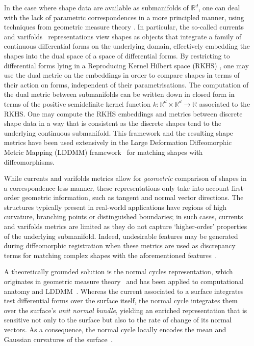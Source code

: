 \documentclass[sn-mathphys-num]{sn-jnl}%
\theoremstyle{thmstyleone}%
\theoremstyle{thmstyletwo}%
\theoremstyle{thmstylethree}%
\numberwithin{remark}{section}
\numberwithin{definition}{section}
\numberwithin{equation}{section}
\numberwithin{theorem}{section}
\newcommand{\R}{\ensuremath{\mathbb{R}}}%
\newcommand{\tit}[1]{\textit{#1}}
\begin{document}
In the case where shape data are available as submanifolds of $\R^{d}$, one can deal with the lack of parametric correspondences in a more principled manner, using techniques from geometric measure theory \cite{FidelityMetrics}. In particular,  the so-called currents \cite{GlaunesCurrents} and varifolds~\cite{Charon} representations  view shapes as objects that integrate a family of continuous differential forms on the underlying domain, effectively embedding the shapes into the dual space of a space of differential forms. By restricting to differential forms lying in a Reproducing Kernel Hilbert space (RKHS) \cite{RKHS}, one may use the dual metric on the embeddings in order to compare shapes in terms of their action on forms, independent of their parametrisations. The computation of the dual metric between submanifolds can be written down in closed form in terms of the positive semidefinite kernel function $k\colon\R^{d}\times \R^{d} \to \R$ associated to the RKHS. One may compute the RKHS embeddings and metrics between discrete shape data in a way that is consistent as the discrete shapes tend to the underlying continuous submanifold. This framework and the resulting shape metrics  have been used extensively  in the Large Deformation Diffeomorphic Metric Mapping (LDDMM) framework~\cite{FidelityMetrics}  for matching shapes with diffeomorphisms.

While currents and varifolds metrics allow for \tit{geometric} comparison of shapes in a correspondence-less manner, these representations only take into account first-order geometric information, such as tangent and normal vector directions. The structures  typically present in real-world applications have regions of high curvature, branching points or distinguished boundaries; in such cases, currents and varifolds metrics are limited as they do  not capture `higher-order' properties of the underlying submanifold. Indeed,  undesirable features may be generated during diffeomorphic registration when these metrics are used as discrepancy terms for matching complex shapes with the aforementioned features~\cite{FidelityMetrics}. 

A theoretically grounded solution is the normal cycles representation, which originates in geometric measure theory~\cite{Federer,Federer1959} and has been applied to computational anatomy and LDDMM~\cite{NCThesis,NCpaper}. Whereas the current associated to a surface integrates test differential forms over the surface itself, the normal cycle integrates them over the surface's \tit{unit normal bundle}, yielding an enriched representation that is sensitive not only to the surface but also to the rate of change of its normal vectors. As a consequence, the normal cycle locally encodes the mean and Gaussian curvatures of the surface~\cite{NCThesis}.
\end{document}
